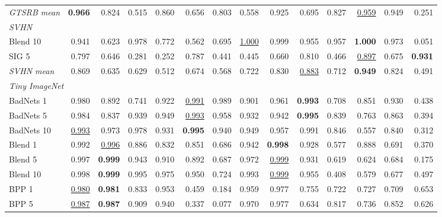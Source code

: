 \begin{table}[htbp]
\begin{adjustbox}{max width=\textwidth}
\begin{tabular}{lrrrrrrrrrrrrr}
\rowcolor{black!8}\emph{GTSRB mean} & \textbf{0.966} & 0.824 & 0.515 & 0.860 & 0.656 & 0.803 & 0.558 & 0.925 & 0.695 & 0.827 & \underline{0.959} & 0.949 & \textcolor{black!45}{0.251} \\
\multicolumn{14}{l}{\emph{SVHN}} \\
Blend 10 & 0.941 & 0.623 & 0.978 & 0.772 & 0.562 & 0.695 & \underline{1.000} & 0.999 & 0.955 & 0.957 & \textbf{1.000} & 0.973 & \textcolor{black!45}{0.051} \\
SIG 5 & 0.797 & 0.646 & \textcolor{black!45}{0.281} & \textcolor{black!45}{0.252} & 0.787 & \textcolor{black!45}{0.441} & \textcolor{black!45}{0.445} & 0.660 & 0.810 & \textcolor{black!45}{0.466} & \underline{0.897} & 0.675 & \textbf{0.931} \\
\rowcolor{black!8}\emph{SVHN mean} & 0.869 & 0.635 & 0.629 & 0.512 & 0.674 & 0.568 & 0.722 & 0.830 & \underline{0.883} & 0.712 & \textbf{0.949} & 0.824 & \textcolor{black!45}{0.491} \\
\multicolumn{14}{l}{\emph{Tiny ImageNet}} \\
BadNets 1 & 0.980 & 0.892 & 0.741 & 0.922 & \underline{0.991} & 0.989 & 0.901 & 0.961 & \textbf{0.993} & 0.708 & 0.851 & 0.930 & \textcolor{black!45}{0.438} \\
BadNets 5 & 0.984 & 0.837 & 0.939 & 0.949 & \underline{0.993} & 0.958 & 0.932 & 0.942 & \textbf{0.995} & 0.839 & 0.763 & 0.863 & \textcolor{black!45}{0.394} \\
BadNets 10 & \underline{0.993} & 0.973 & 0.978 & 0.931 & \textbf{0.995} & 0.940 & 0.949 & 0.957 & 0.991 & 0.846 & 0.557 & 0.840 & \textcolor{black!45}{0.312} \\
Blend 1 & 0.992 & \underline{0.996} & 0.886 & 0.832 & 0.851 & 0.686 & 0.942 & \textbf{0.998} & 0.928 & 0.577 & 0.888 & 0.691 & \textcolor{black!45}{0.370} \\
Blend 5 & 0.997 & \textbf{0.999} & 0.943 & 0.910 & 0.892 & 0.687 & 0.972 & \underline{0.999} & 0.931 & 0.619 & 0.624 & 0.684 & \textcolor{black!45}{0.175} \\
Blend 10 & 0.998 & \textbf{0.999} & 0.995 & 0.975 & 0.950 & 0.724 & 0.993 & \underline{0.999} & 0.955 & \textcolor{black!45}{0.408} & 0.579 & 0.677 & \textcolor{black!45}{0.497} \\
BPP 1 & \underline{0.980} & \textbf{0.981} & 0.833 & 0.953 & \textcolor{black!45}{0.459} & \textcolor{black!45}{0.184} & 0.959 & 0.977 & 0.755 & 0.722 & 0.727 & 0.709 & 0.653 \\
BPP 5 & \underline{0.987} & \textbf{0.987} & 0.909 & 0.940 & \textcolor{black!45}{0.337} & \textcolor{black!45}{0.077} & 0.970 & 0.977 & 0.634 & 0.817 & 0.736 & 0.852 & 0.626 \\

\end{tabular}
\end{adjustbox}
\end{table}
